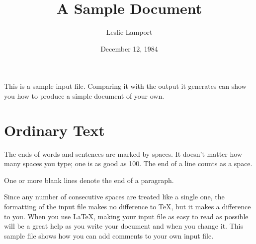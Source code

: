 % 


\title{A Sample Document}  %
\author{Leslie Lamport}    %
\date{December 12, 1984}   %


\maketitle                 %

This is a sample input file.  Comparing it with the output it 
generates can show you how to produce a simple document of 
your own.

\section{Ordinary Text}  %

The ends  of words and sentences are marked 
  by   spaces. It  doesn't matter how many 
spaces    you type; one is as good as 100.  The 
end of   a line counts as a space.

One   or more   blank lines denote the  end 
of  a paragraph.

Since any number of consecutive spaces are treated like a single 
one, the formatting of the input file makes no difference to 
      \TeX,         %
but it makes a difference to you. 
When you use 
      \LaTeX,       %
making your input file as easy to read as possible 
will be a great help as you write your document and when you 
change it.  This sample file shows how you can add comments to 
your own input file.

